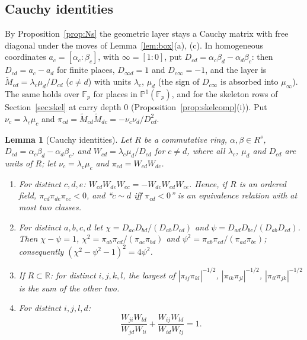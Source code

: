 \documentclass[11pt]{amsart}
\newtheorem{lemma}[theorem]{Lemma}
\theoremstyle{definition}
\theoremstyle{plain}
\newcommand{\F}{\mathbb{F}}
\providecommand{\R}{\mathbb{R}}
\begin{document}
\subsection{Cauchy identities}
By Proposition~\ref{prop:Ns} the geometric layer stays a Cauchy matrix with free diagonal under the moves of Lemma~\ref{lem:box}(a), (c). In homogeneous coordinates $a_c=[\alpha_c:\beta_c]$, with $\infty=[1:0]$, put $D_{cd}=\alpha_c\beta_d-\alpha_d\beta_c$: then $D_{cd}=a_c-a_d$ for finite places, $D_{\infty d}=1$ and $D_{c\infty}=-1$, and the layer is $\tilde M_{cd}=\lambda_c\mu_d/D_{cd}$ ($c\ne d$) with units $\lambda_c$, $\mu_d$ (the sign of $D_{c\infty}$ is absorbed into $\mu_\infty$). The same holds over $\F_p$ for places in $\mathbb P^1(\F_p)$, and for the skeleton rows of Section~\ref{sec:skel} at carry depth $0$ (Proposition~\ref{prop:skelcomp}(i)). Put $\nu_c=\lambda_c\mu_c$ and $\pi_{cd}=\tilde M_{cd}\tilde M_{dc}=-\nu_c\nu_d/D_{cd}^2$.

\begin{lemma}[Cauchy identities]\label{lem:CH}
Let $R$ be a commutative ring, $\alpha,\beta\in R^s$, $D_{cd}=\alpha_c\beta_d-\alpha_d\beta_c$, and $W_{cd}=\lambda_c\mu_d/D_{cd}$ for $c\ne d$, where all $\lambda_c$, $\mu_d$ and $D_{cd}$ are units of $R$; let $\nu_c=\lambda_c\mu_c$ and $\pi_{cd}=W_{cd}W_{dc}$.
\begin{enumerate}
\item[(C)] For distinct $c,d,e$: $W_{cd}W_{de}W_{ec}=-W_{dc}W_{ed}W_{ce}$. Hence, if $R$ is an ordered field, $\pi_{cd}\pi_{de}\pi_{ec}<0$, and ``$c\sim d$ iff $\pi_{cd}<0$'' is an equivalence relation with at most two classes.
\item[(P)] For distinct $a,b,c,d$ let $\chi=D_{ac}D_{bd}/(D_{ab}D_{cd})$ and $\psi=D_{ad}D_{bc}/(D_{ab}D_{cd})$. Then $\chi-\psi=1$, $\chi^2=\pi_{ab}\pi_{cd}/(\pi_{ac}\pi_{bd})$ and $\psi^2=\pi_{ab}\pi_{cd}/(\pi_{ad}\pi_{bc})$; consequently $(\chi^2-\psi^2-1)^2=4\psi^2$.
\item[(H)] If $R\subset\R$: for distinct $i,j,k,l$, the largest of $|\pi_{ij}\pi_{kl}|^{-1/2}$, $|\pi_{ik}\pi_{jl}|^{-1/2}$, $|\pi_{il}\pi_{jk}|^{-1/2}$ is the sum of the other two.
\item[(X)] For distinct $i,j,l,d$:
\[
\frac{W_{ji}W_{ld}}{W_{jd}W_{li}}+\frac{W_{ij}W_{ld}}{W_{id}W_{lj}}=1 .
\]
\end{enumerate}
\end{lemma}
\end{document}
